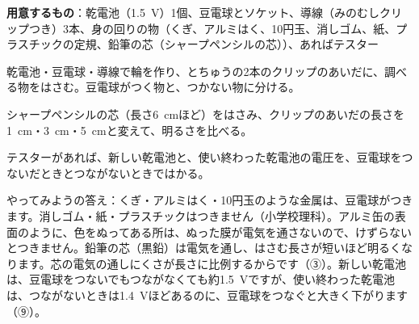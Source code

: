 \begin{yattemiyou}
\textbf{用意するもの}：乾電池（\qty{1.5}{V}）1個、豆電球とソケット、導線（みのむしクリップつき）3本、身の回りの物（くぎ、アルミはく、10円玉、消しゴム、紙、プラスチックの定規、鉛筆の芯（シャープペンシルの芯））、あればテスター\par\vspace{2pt}
\noindent\begin{minipage}[c]{0.62\linewidth}
\begin{enumerate}[label={\bkcircled[bkGreen]{\arabic*}}, leftmargin=2.4\zw, itemsep=1pt, topsep=0pt]
\item 乾電池・豆電球・導線で輪を作り、とちゅうの2本のクリップのあいだに、調べる物をはさむ。豆電球がつく物と、つかない物に分ける。
\item シャープペンシルの芯（長さ\qty{6}{cm}ほど）をはさみ、クリップのあいだの長さを\qty{1}{cm}・\qty{3}{cm}・\qty{5}{cm}と変えて、明るさを比べる。
\item テスターがあれば、新しい乾電池と、使い終わった乾電池の電圧を、豆電球をつないだときとつながないときではかる。
\end{enumerate}
\end{minipage}\hfill
\begin{minipage}[c]{0.35\linewidth}\centering
{}
\end{minipage}
\end{yattemiyou}

\noindent やってみようの答え：くぎ・アルミはく・10円玉のような金属は、豆電球がつきます。消しゴム・紙・プラスチックはつきません（小学校理科）。アルミ缶の表面のように、色をぬってある所は、ぬった膜が電気を通さないので、けずらないとつきません。鉛筆の芯（黒鉛）は電気を通し、はさむ長さが短いほど明るくなります。芯の電気の通しにくさが長さに比例するからです（③）。新しい乾電池は、豆電球をつないでもつながなくても約\qty{1.5}{V}ですが、使い終わった乾電池は、つながないときは\qty{1.4}{V}ほどあるのに、豆電球をつなぐと大きく下がります（⑨）。

